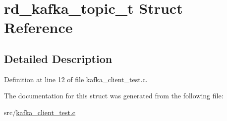 \hypertarget{structrd__kafka__topic__t}{\section{rd\-\_\-kafka\-\_\-topic\-\_\-t \-Struct \-Reference}
\label{structrd__kafka__topic__t}
}


\subsection{\-Detailed \-Description}


\-Definition at line 12 of file kafka\-\_\-client\-\_\-test.\-c.



\-The documentation for this struct was generated from the following file\-:\begin{DoxyCompactItemize}
\item 
src/\hyperlink{kafka__client__test_8c}{kafka\-\_\-client\-\_\-test.\-c}\end{DoxyCompactItemize}
